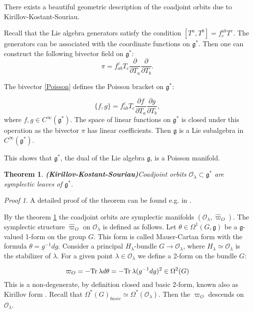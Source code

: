 \documentclass[11pt]{report}
\theoremstyle{plain}
\newtheorem{thm}{Theorem}[section]
\theoremstyle{definition}
\theoremstyle{remark}
\theoremstyle{remark}
\newtheorem*{pr}{Proof}
\numberwithin{equation}{section}
\begin{document}
 There exists a beautiful geometric description of the coadjoint orbits due to Kirillov-Kostant-Souriau. 
 
 Recall that the Lie algebra generators satisfy the condition $[T^a, T^b] = f^{ab}_c T^c$. The generators can be associated with the coordinate functions on $\mathfrak{g}^*$. Then one can construct the following bivector field on $\mathfrak{g}^*$:
 \begin{equation}\label{Poisson}
 \pi = f_{ab}^cT_c\frac{\partial}{\partial T_a}\frac{\partial}{\partial T_b}.
 \end{equation}
 
 The bivector \eqref{Poisson} defines the Poisson bracket on $\mathfrak{g}^*$:

 \begin{equation}
 \{f,g\} = f_{ab}^c T_c \frac{\partial f}{\partial T_a} \frac{\partial g}{\partial T_b},
 \end{equation}
 where $f, g \in C^\infty(\mathfrak{g}^*)$. The space of linear functions on $\mathfrak{g}^*$ is closed under this operation as the bivector $\pi$ has linear coefficients. Then $\mathfrak{g}$ is a Lie subalgebra in $C^\infty(\mathfrak{g}^*)$. 
 
 This shows that $\mathfrak{g}^*$, the dual of the Lie algebra $\mathfrak{g}$, is a Poisson manifold.
 
 \begin{thm}{\textbf{(Kirillov-Kostant-Souriau)}}\label{KKS}
 Coadjoint orbits $\mathcal{O}_\lambda \subset \mathfrak{g}^*$ are symplectic leaves of $\mathfrak{g}^*$.
 \end{thm}
 
 \begin{pr}
 A detailed proof of the theorem can be found e.g. in \cite{Kirusha}.
 \end{pr}
 
By the theorem \ref{KKS} the coadjoint orbits are symplectic manifolds $(\mathcal{O}_\lambda,\hat{\varpi}_O)$. The symplectic structure $\hat{\varpi}_O$ on $\mathcal{O}_\lambda$  is defined as follows. Let $\theta \in \Omega^1(G, \mathfrak{g})$ be a $\mathfrak{g}$-valued 1-form on the group $G$. This form is called Mauer-Cartan form with the formula $\theta = g^{-1}dg$. 
Consider a principal $H_\lambda$-bundle $G \to \mathcal{O}_\lambda$, where $H_\lambda \simeq \mathcal{O}_\lambda$ is the stabilizer of $\lambda$. 
For a given point $\lambda \in \mathcal{O}_\lambda$ we define a 2-form on the bundle $G$:

\begin{equation}\label{SonG}
\varpi_O = -  {\rm Tr} \, \lambda d \theta =  - {\rm Tr} \, \lambda(g^{-1}dg)^2 \in \Omega^2(G)
\end{equation}
This is a non-degenerate, by definition closed and basic 2-form, known also as Kirillov form \cite{Kirusha}. Recall that $\Omega^*(G)_{basic} \simeq \Omega^*(\mathcal{O}_\lambda)$. Then the $\varpi_O$ descends on $\mathcal{O}_\lambda$. 
\end{document}
